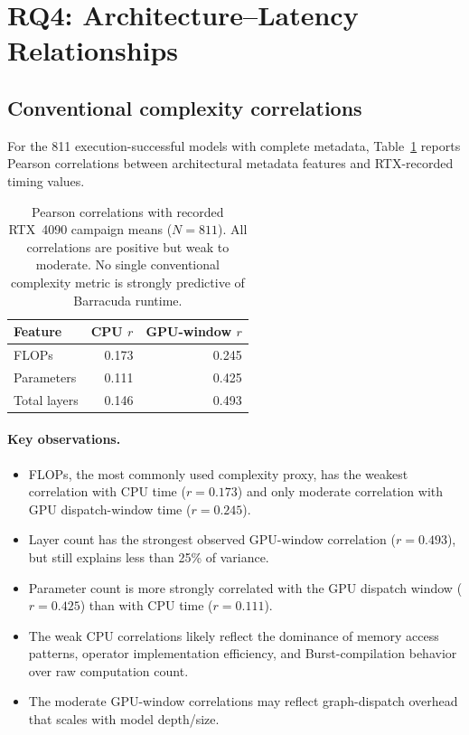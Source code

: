 \documentclass[10pt,twocolumn,letterpaper]{article}
\begin{document}
\section{RQ4: Architecture--Latency Relationships}\label{sec:rq4}

\subsection{Conventional complexity correlations}

For the 811 execution-successful models with complete metadata, Table~\ref{tab:corr} reports Pearson correlations between architectural metadata features and RTX-recorded timing values.

\begin{table}[t]
\centering\small
\begin{tabular}{lrr}
\toprule
Feature & CPU $r$ & GPU-window $r$ \\
\midrule
FLOPs & 0.173 & 0.245 \\
Parameters & 0.111 & 0.425 \\
Total layers & 0.146 & 0.493 \\
\bottomrule
\end{tabular}
\caption{Pearson correlations with recorded RTX~4090 campaign means ($N = 811$). All correlations are positive but weak to moderate. No single conventional complexity metric is strongly predictive of Barracuda runtime.}
\label{tab:corr}
\end{table}

\paragraph{Key observations.}
\begin{itemize}[nosep,leftmargin=*]
  \item FLOPs, the most commonly used complexity proxy, has the weakest correlation with CPU time ($r = 0.173$) and only moderate correlation with GPU dispatch-window time ($r = 0.245$).
  \item Layer count has the strongest observed GPU-window correlation ($r = 0.493$), but still explains less than 25\% of variance.
  \item Parameter count is more strongly correlated with the GPU dispatch window ($r = 0.425$) than with CPU time ($r = 0.111$).
  \item The weak CPU correlations likely reflect the dominance of memory access patterns, operator implementation efficiency, and Burst-compilation behavior over raw computation count.
  \item The moderate GPU-window correlations may reflect graph-dispatch overhead that scales with model depth/size.
\end{itemize}
\end{document}
